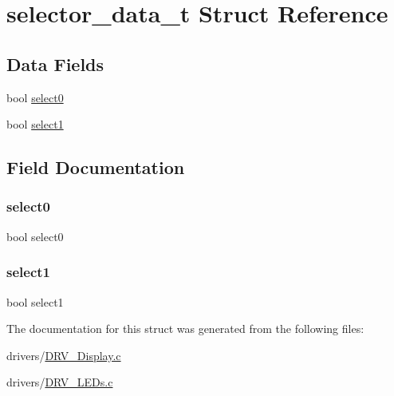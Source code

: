 \hypertarget{structselector__data__t}{}\section{selector\+\_\+data\+\_\+t Struct Reference}
\label{structselector__data__t}
\subsection*{Data Fields}
\begin{DoxyCompactItemize}
\item 
bool \mbox{\hyperlink{structselector__data__t_a3a3bc1adc47708aab1b0c07065d67e6b}{select0}}
\item 
bool \mbox{\hyperlink{structselector__data__t_aabf77c8efc26fec8772c6c07b1772035}{select1}}
\end{DoxyCompactItemize}


\subsection{Field Documentation}
\mbox{\label{structselector__data__t_a3a3bc1adc47708aab1b0c07065d67e6b}} 
\subsubsection{\texorpdfstring{select0}{select0}}
{\footnotesize\ttfamily bool select0}

\mbox{\label{structselector__data__t_aabf77c8efc26fec8772c6c07b1772035}} 
\subsubsection{\texorpdfstring{select1}{select1}}
{\footnotesize\ttfamily bool select1}



The documentation for this struct was generated from the following files\+:\begin{DoxyCompactItemize}
\item 
drivers/\mbox{\hyperlink{_d_r_v___display_8c}{D\+R\+V\+\_\+\+Display.\+c}}\item 
drivers/\mbox{\hyperlink{_d_r_v___l_e_ds_8c}{D\+R\+V\+\_\+\+L\+E\+Ds.\+c}}\end{DoxyCompactItemize}
